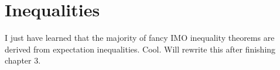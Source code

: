 \chapter{Inequalities}
I just have learned that the majority of fancy IMO inequality theorems are derived from expectation inequalities. Cool. Will rewrite this after finishing chapter 3.